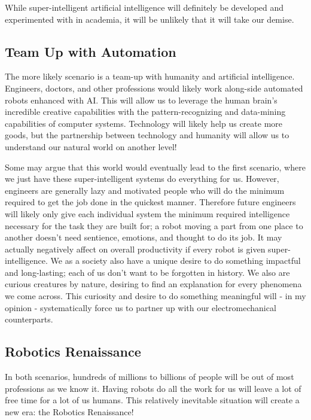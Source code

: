 While super-intelligent artificial intelligence will definitely be developed and experimented with in academia, it will be unlikely that it will take our demise.

\subsection{Team Up with Automation}

The more likely scenario is a team-up with humanity and artificial intelligence. Engineers, doctors, and other professions would likely work along-side automated robots enhanced with AI. This will allow us to leverage the human brain's incredible creative capabilities with the pattern-recognizing and data-mining capabilities of computer systems. Technology will likely help us create more goods, but the partnership between technology and humanity will allow us to understand our natural world on another level!

Some may argue that this world would eventually lead to the first scenario, where we just have these super-intelligent systems do everything for us. However, engineers are generally lazy and motivated people who will do the minimum required to get the job done in the quickest manner. Therefore future engineers will likely only give each individual system the minimum required intelligence necessary for the task they are built for; a robot moving a part from one place to another doesn't need sentience, emotions, and thought to do its job. It may actually negatively affect on overall productivity if every robot is given super-intelligence. We as a society also have a unique desire to do something impactful and long-lasting; each of us don't want to be forgotten in history. We also are curious creatures by nature, desiring to find an explanation for every phenomena we come across. This curiosity and desire to do something meaningful will - in my opinion - systematically force us to partner up with our electromechanical counterparts.

\subsection{Robotics Renaissance}

In both scenarios, hundreds of millions to billions of people will be out of most professions as we know it. Having robots do all the work for us will leave a lot of free time for a lot of us humans. This relatively inevitable situation will create a new era: the Robotics Renaissance!

